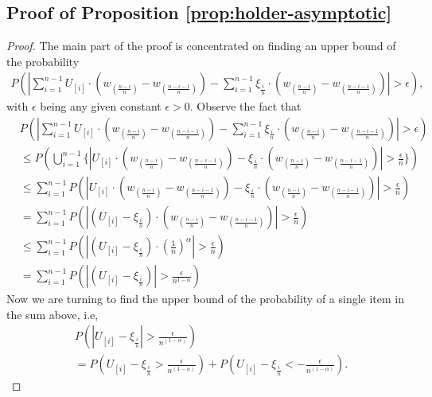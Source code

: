 \subsection*{Proof of Proposition \ref{prop:holder-asymptotic}}
\begin{proof}
The main part of the proof is concentrated on finding an upper bound of the probability
\begin{align}
P ( \left| \sum_{i=1}^{n-1} U_{[i]} \cdot (w_{(\frac{n-i}{n})} - w_{(\frac{n-i-1}{n})}) -
\sum_{i=1}^{n-1} \xi_{\frac{i}{n}} \cdot (w_{(\frac{n-i}{n})} - w_{(\frac{n-i-1}{n})}) \right| >
\epsilon),
\end{align}
with $\epsilon$
being any given constant $\epsilon>0$.
Observe the fact that
\begin{align*}
& P ( \left| \sum_{i=1}^{n-1} U_{[i]} \cdot (w_{(\frac{n-i}{n})} - w_{(\frac{n-i-1}{n})}) -
\sum_{i=1}^{n-1} \xi_{\frac{i}{n}} \cdot (w_{(\frac{n-i}{n})} - w_{(\frac{n-i-1}{n})}) \right| >
\epsilon) \\ & \leq P ( \bigcup _{i=1}^{n-1} \{ \left| U_{[i]} \cdot (w_{(\frac{n-i}{n})} -
w_{(\frac{n-i-1}{n})}) - \xi_{\frac{i}{n}} \cdot (w_{(\frac{n-i}{n})} - w_{(\frac{n-i-1}{n})})
\right| > \frac{\epsilon}{n} \}) \\ & \leq \sum _{i=1}^{n-1} P ( \left| U_{[i]} \cdot
(w_{(\frac{n-i}{n})} - w_{(\frac{n-i-1}{n})}) - \xi_{\frac{i}{n}} \cdot (w_{(\frac{n-i}{n})} -
w_{(\frac{n-i-1}{n})}) \right| > \frac{\epsilon}{n}) \\ & = \sum _{i=1}^{n-1} P ( \left| ( U_{[i]} -
\xi_{\frac{i}{n}}) \cdot (w_{(\frac{n-i}{n})} - w_{(\frac{n-i-1}{n})}) \right| > \frac{\epsilon}{n})
\\ & \leq \sum _{i=1}^{n-1} P ( \left| ( U_{[i]} - \xi_{\frac{i}{n}}) \cdot (\frac{1}{n})^{\alpha}
\right| > \frac{\epsilon}{n}) \\ & = \sum _{i=1}^{n-1} P ( \left| ( U_{[i]} - \xi_{\frac{i}{n}})
\right| > \frac{\epsilon}{n^{1-\alpha}})
\end{align*}
Now we are turning to find the upper bound of the probability of a single item in the sum above, i.e,
\begin{align*}
& P( \left | U_{[i]} - \xi_{\frac{i}{n}} \right | > \frac {\epsilon} {n^{(1-\alpha)}}) \\ & = P (
    U_{[i]} - \xi_{\frac{i}{n}} > \frac {\epsilon} {n^{(1-\alpha)}}) + P ( U_{[i]} -
    \xi_{\frac{i}{n}} < - \frac {\epsilon} {n^{(1-\alpha)}}).
\end{align*} 


\end{proof}
